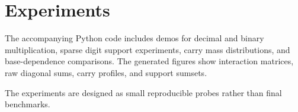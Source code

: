 \section{Experiments}

The accompanying Python code includes demos for decimal and binary
multiplication, sparse digit support experiments, carry mass distributions, and
base-dependence comparisons. The generated figures show interaction matrices,
raw diagonal sums, carry profiles, and support sumsets.

The experiments are designed as small reproducible probes rather than final
benchmarks.
